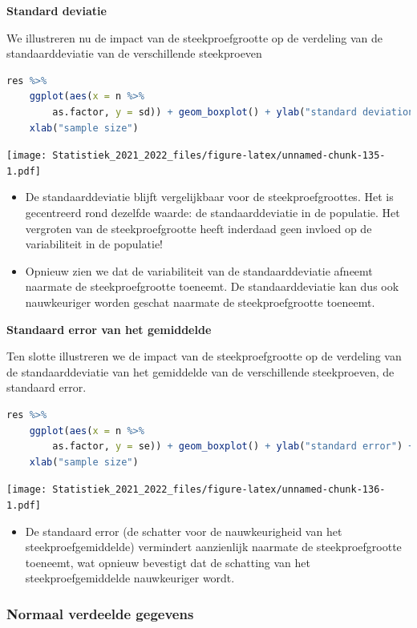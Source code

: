 \documentclass[
  12pt,dutch,coursenotes]{book}
\providecommand{\tightlist}{%
  \setlength{\itemsep}{0pt}\setlength{\parskip}{0pt}}
\theoremstyle{definition}
\theoremstyle{definition}
\theoremstyle{definition}
\theoremstyle{definition}
\theoremstyle{remark}
\begin{document}
\textbf{Standard deviatie}

We illustreren nu de impact van de steekproefgrootte op de verdeling van de standaarddeviatie van de verschillende steekproeven

\begin{lstlisting}[language=R]
res %>%
    ggplot(aes(x = n %>%
        as.factor, y = sd)) + geom_boxplot() + ylab("standard deviation") +
    xlab("sample size")
\end{lstlisting}

\texttt{[image: Statistiek\_2021\_2022\_files/figure-latex/unnamed-chunk-135-1.pdf]}

\begin{itemize}
\item
  De standaarddeviatie blijft vergelijkbaar voor de steekproefgroottes.
  Het is gecentreerd rond dezelfde waarde: de standaarddeviatie in de populatie. Het vergroten van de steekproefgrootte heeft inderdaad geen invloed op de variabiliteit in de populatie!
\item
  Opnieuw zien we dat de variabiliteit van de standaarddeviatie afneemt naarmate de steekproefgrootte toeneemt. De standaarddeviatie kan dus ook nauwkeuriger worden geschat naarmate de steekproefgrootte toeneemt.
\end{itemize}

\textbf{Standaard error van het gemiddelde}

Ten slotte illustreren we de impact van de steekproefgrootte op de verdeling van de standaarddeviatie van het gemiddelde van de verschillende steekproeven, de standaard error.

\begin{lstlisting}[language=R]
res %>%
    ggplot(aes(x = n %>%
        as.factor, y = se)) + geom_boxplot() + ylab("standard error") +
    xlab("sample size")
\end{lstlisting}

\texttt{[image: Statistiek\_2021\_2022\_files/figure-latex/unnamed-chunk-136-1.pdf]}

\begin{itemize}
\tightlist
\item
  De standaard error (de schatter voor de nauwkeurigheid van het steekproefgemiddelde) vermindert aanzienlijk naarmate de steekproefgrootte toeneemt, wat opnieuw bevestigt dat de schatting van het steekproefgemiddelde nauwkeuriger wordt.
\end{itemize}

\hypertarget{normaal-verdeelde-gegevens}{%
\subsubsection{Normaal verdeelde gegevens}\label{normaal-verdeelde-gegevens}}
\end{document}
